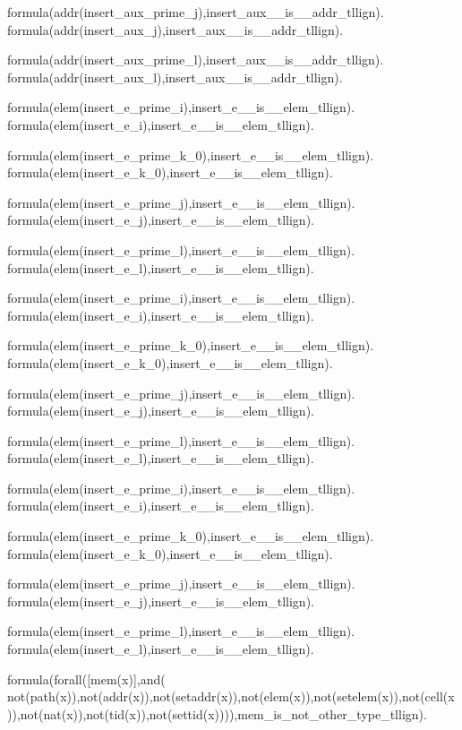 formula(addr(insert\_aux\_prime\_j),insert\_aux\_\_is\_\_addr\_tllign).  formula(addr(insert\_aux\_j),insert\_aux\_\_is\_\_addr\_tllign).    

formula(addr(insert\_aux\_prime\_l),insert\_aux\_\_is\_\_addr\_tllign).  formula(addr(insert\_aux\_l),insert\_aux\_\_is\_\_addr\_tllign).    

formula(elem(insert\_e\_prime\_i),insert\_e\_\_is\_\_elem\_tllign).  formula(elem(insert\_e\_i),insert\_e\_\_is\_\_elem\_tllign).    

formula(elem(insert\_e\_prime\_k\_0),insert\_e\_\_is\_\_elem\_tllign).    formula(elem(insert\_e\_k\_0),insert\_e\_\_is\_\_elem\_tllign).  

formula(elem(insert\_e\_prime\_j),insert\_e\_\_is\_\_elem\_tllign).  formula(elem(insert\_e\_j),insert\_e\_\_is\_\_elem\_tllign).    

formula(elem(insert\_e\_prime\_l),insert\_e\_\_is\_\_elem\_tllign).  formula(elem(insert\_e\_l),insert\_e\_\_is\_\_elem\_tllign).    

formula(elem(insert\_e\_prime\_i),insert\_e\_\_is\_\_elem\_tllign).  formula(elem(insert\_e\_i),insert\_e\_\_is\_\_elem\_tllign).    

formula(elem(insert\_e\_prime\_k\_0),insert\_e\_\_is\_\_elem\_tllign).    formula(elem(insert\_e\_k\_0),insert\_e\_\_is\_\_elem\_tllign).  

formula(elem(insert\_e\_prime\_j),insert\_e\_\_is\_\_elem\_tllign).  formula(elem(insert\_e\_j),insert\_e\_\_is\_\_elem\_tllign).    

formula(elem(insert\_e\_prime\_l),insert\_e\_\_is\_\_elem\_tllign).  formula(elem(insert\_e\_l),insert\_e\_\_is\_\_elem\_tllign).    

formula(elem(insert\_e\_prime\_i),insert\_e\_\_is\_\_elem\_tllign).  formula(elem(insert\_e\_i),insert\_e\_\_is\_\_elem\_tllign).    

formula(elem(insert\_e\_prime\_k\_0),insert\_e\_\_is\_\_elem\_tllign).    formula(elem(insert\_e\_k\_0),insert\_e\_\_is\_\_elem\_tllign).  

formula(elem(insert\_e\_prime\_j),insert\_e\_\_is\_\_elem\_tllign).  formula(elem(insert\_e\_j),insert\_e\_\_is\_\_elem\_tllign).    

formula(elem(insert\_e\_prime\_l),insert\_e\_\_is\_\_elem\_tllign).  formula(elem(insert\_e\_l),insert\_e\_\_is\_\_elem\_tllign).    



formula(forall([mem(x)],and(    not(path(x)),not(addr(x)),not(setaddr(x)),not(elem(x)),not(setelem(x)),not(cell(x)),not(nat(x)),not(tid(x)),not(settid(x)))),mem\_is\_not\_other\_type\_tllign).

